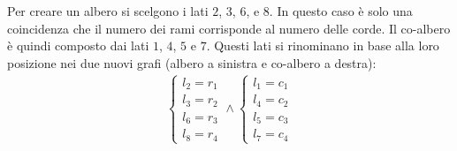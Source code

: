 \documentclass{article}
\numberwithin{equation}{subsection}
\begin{document}
Per creare un albero si scelgono i lati $2$, $3$, $6$, e $8$. In questo caso è solo una coincidenza che il numero dei rami corrisponde al numero delle corde. Il co-albero 
è quindi composto dai lati $1$, $4$, $5$ e $7$. Questi lati si rinominano in base alla loro posizione nei due nuovi grafi (albero a sinistra e co-albero a destra):
\begin{gather*}
    \begin{cases}
        l_2=r_1\\
        l_3=r_2\\
        l_6=r_3\\
        l_8=r_4
    \end{cases}\land
    \begin{cases}
        l_1=c_1\\
        l_4=c_2\\
        l_5=c_3\\
        l_7=c_4
    \end{cases}
\end{gather*}
\end{document}
